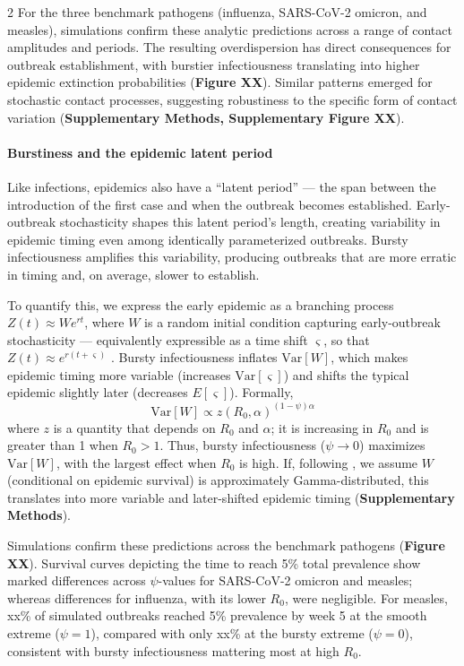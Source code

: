 \documentclass[10pt]{article}
\begin{document}
\begin{multicols}{2}
For the three benchmark pathogens (influenza, SARS-CoV-2 omicron, and measles), simulations confirm these analytic predictions across a range of contact amplitudes and periods. The resulting overdispersion has direct consequences for outbreak establishment, with burstier infectiousness translating into higher epidemic extinction probabilities ({\bf Figure XX}). Similar patterns emerged for stochastic contact processes, suggesting robustiness to the specific form of contact variation ({\bf Supplementary Methods, Supplementary Figure XX}). 

\paragraph{Burstiness and the epidemic latent period}

Like infections, epidemics also have a ``latent period'' --- the span between the introduction of the first case and when the outbreak becomes established. Early-outbreak stochasticity shapes this latent period's length, creating variability in epidemic timing even among identically parameterized outbreaks.\citep{morris_computation_2024} Bursty infectiousness amplifies this variability, producing outbreaks that are more erratic in timing and, on average, slower to establish. 

To quantify this, we express the early epidemic as a branching process $Z(t) \approx W e^{rt}$, where $W$ is a random initial condition capturing early-outbreak stochasticity --- equivalently expressible as a time shift $\varsigma$, so that $Z(t) \approx e^{r(t + \varsigma)}$ \citep{morris_computation_2024}. Bursty infectiousness inflates $\text{Var}[W]$, which makes epidemic timing more variable (increases $\text{Var}[\varsigma]$) and shifts the typical epidemic slightly later (decreases $E[\varsigma]$). Formally, 
\begin{equation}
	\text{Var}[W] \propto z(R_0, \alpha)^{(1 - \psi)\alpha}
\end{equation}
where $z$ is a quantity that depends on $R_0$ and $\alpha$; it is increasing in $R_0$ and is greater than 1 when $R_0 > 1$. Thus, bursty infectiousness ($\psi \rightarrow 0$) maximizes $\text{Var}[W]$, with the largest effect when $R_0$ is high. If, following \citet{morris_computation_2024}, we assume $W$ (conditional on epidemic survival) is approximately Gamma-distributed, this translates into more variable and later-shifted epidemic timing ({\bf Supplementary Methods}). 

Simulations confirm these predictions across the benchmark pathogens ({\bf Figure XX}). Survival curves depicting the time to reach 5\% total prevalence show marked differences across $\psi$-values for SARS-CoV-2 omicron and measles; whereas differences for influenza, with its lower $R_0$, were negligible. For measles, xx\% of simulated outbreaks reached 5\% prevalence by week 5 at the smooth extreme ($\psi = 1$), compared with only xx\% at the bursty extreme ($\psi = 0$), consistent with bursty infectiousness mattering most at high $R_0$. 


\end{multicols}
\end{document}
